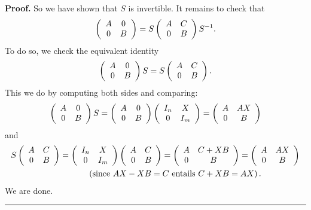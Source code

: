 \documentclass[numbers=enddot,12pt,final,onecolumn,notitlepage]{scrartcl}%
\numberwithin{exer}{subsection}
\theoremstyle{definition}
\newenvironment{proof}[1][Proof]{\noindent\textbf{#1.} }{\ \rule{0.5em}{0.5em}}
\begin{document}
\begin{proof}
So we have shown that $S$ is invertible. It remains to check that%
\[
\left(
\begin{array}
[c]{cc}%
A & 0\\
0 & B
\end{array}
\right)  =S\left(
\begin{array}
[c]{cc}%
A & C\\
0 & B
\end{array}
\right)  S^{-1}.
\]
To do so, we check the equivalent identity%
\[
\left(
\begin{array}
[c]{cc}%
A & 0\\
0 & B
\end{array}
\right)  S=S\left(
\begin{array}
[c]{cc}%
A & C\\
0 & B
\end{array}
\right)  .
\]
This we do by computing both sides and comparing:%
\[
\left(
\begin{array}
[c]{cc}%
A & 0\\
0 & B
\end{array}
\right)  S=\left(
\begin{array}
[c]{cc}%
A & 0\\
0 & B
\end{array}
\right)  \left(
\begin{array}
[c]{cc}%
I_{n} & X\\
0 & I_{m}%
\end{array}
\right)  =\left(
\begin{array}
[c]{cc}%
A & AX\\
0 & B
\end{array}
\right)
\]
and%
\begin{align*}
S\left(
\begin{array}
[c]{cc}%
A & C\\
0 & B
\end{array}
\right)    & =\left(
\begin{array}
[c]{cc}%
I_{n} & X\\
0 & I_{m}%
\end{array}
\right)  \left(
\begin{array}
[c]{cc}%
A & C\\
0 & B
\end{array}
\right)  =\left(
\begin{array}
[c]{cc}%
A & C+XB\\
0 & B
\end{array}
\right)  =\left(
\begin{array}
[c]{cc}%
A & AX\\
0 & B
\end{array}
\right)  \\
& \ \ \ \ \ \ \ \ \ \ \left(  \text{since }AX-XB=C\text{ entails
}C+XB=AX\right)  .
\end{align*}
We are done.
\end{proof}
\end{document}
